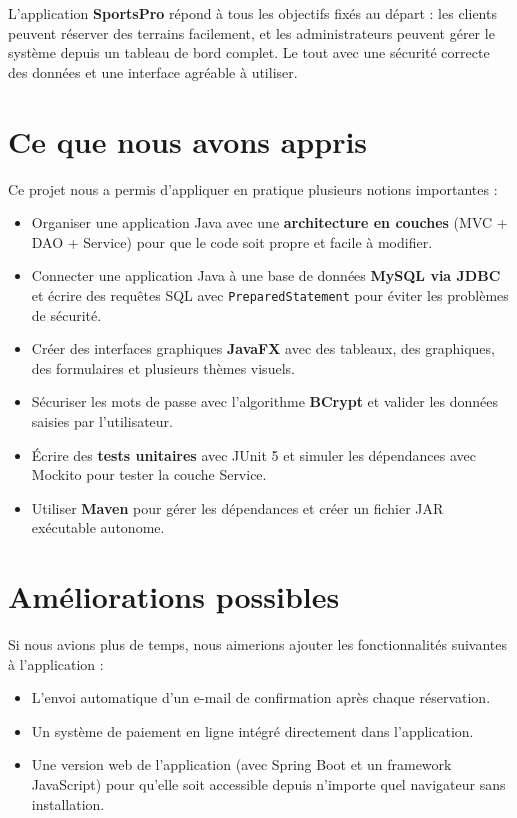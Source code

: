 \documentclass[12pt, a4paper]{report}
\begin{document}
L'application \textbf{SportsPro} répond à tous les objectifs fixés au départ :
les clients peuvent réserver des terrains facilement, et les administrateurs
peuvent gérer le système depuis un tableau de bord complet. Le tout avec
une sécurité correcte des données et une interface agréable à utiliser.

\section*{Ce que nous avons appris}

Ce projet nous a permis d'appliquer en pratique plusieurs notions importantes :

\begin{itemize}
  \item Organiser une application Java avec une \textbf{architecture en couches}
        (MVC + DAO + Service) pour que le code soit propre et facile à modifier.
  \item Connecter une application Java à une base de données \textbf{MySQL via
        JDBC} et écrire des requêtes SQL avec \texttt{PreparedStatement} pour
        éviter les problèmes de sécurité.
  \item Créer des interfaces graphiques \textbf{JavaFX} avec des tableaux,
        des graphiques, des formulaires et plusieurs thèmes visuels.
  \item Sécuriser les mots de passe avec l'algorithme \textbf{BCrypt} et
        valider les données saisies par l'utilisateur.
  \item Écrire des \textbf{tests unitaires} avec JUnit 5 et simuler les
        dépendances avec Mockito pour tester la couche Service.
  \item Utiliser \textbf{Maven} pour gérer les dépendances et créer un
        fichier JAR exécutable autonome.
\end{itemize}

\section*{Améliorations possibles}

Si nous avions plus de temps, nous aimerions ajouter les fonctionnalités
suivantes à l'application :
\begin{itemize}
  \item L'envoi automatique d'un e-mail de confirmation après chaque
        réservation.
  \item Un système de paiement en ligne intégré directement dans
        l'application.
  \item Une version web de l'application (avec Spring Boot et un framework
        JavaScript) pour qu'elle soit accessible depuis n'importe quel
        navigateur sans installation.
\end{itemize}
\end{document}
